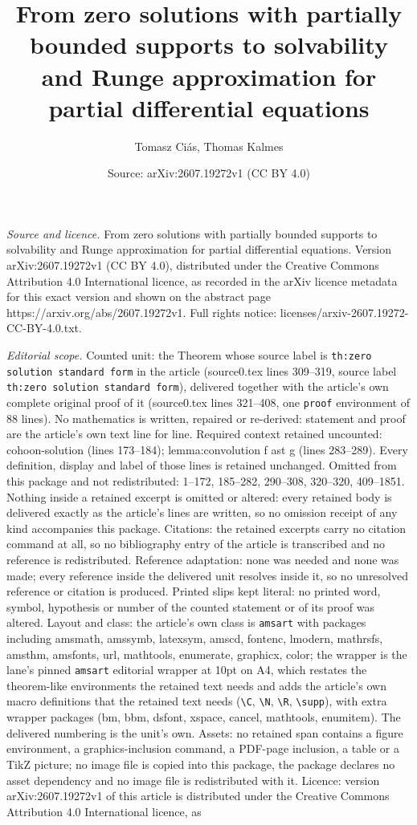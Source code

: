 \documentclass[10pt,a4paper]{amsart}
\title[From zero solutions with partially bounded supports to solva]{From zero solutions with partially bounded supports to solvability and Runge approximation for partial differential equations}
\author{Tomasz Ci\'as, Thomas Kalmes}
\date{Source: arXiv:2607.19272v1 (CC BY 4.0)}
\begin{document}
\maketitle

\noindent\emph{Source and licence.} From zero solutions with partially bounded supports to solvability and Runge approximation for partial differential equations. Version arXiv:2607.19272v1 (CC BY 4.0), distributed under the Creative Commons Attribution 4.0 International licence, as recorded in the arXiv licence metadata for this exact version and shown on the abstract page https://arxiv.org/abs/2607.19272v1. Full rights notice: licenses/arxiv-2607.19272-CC-BY-4.0.txt.\par\smallskip

\noindent\textit{Editorial scope.} Counted unit: the Theorem whose source label is \texttt{th:zero solution standard form} in the article (source0.tex lines 309--319, source label \texttt{th:zero solution standard form}), delivered together with the article's own complete original proof of it (source0.tex lines 321--408, one \texttt{proof} environment of 88 lines). No mathematics is written, repaired or re-derived: statement and proof are the article's own text line for line. Required context retained uncounted: cohoon-solution (lines 173--184); lemma:convolution f ast g (lines 283--289). Every definition, display and label of those lines is retained unchanged. Omitted from this package and not redistributed: 1--172, 185--282, 290--308, 320--320, 409--1851. Nothing inside a retained excerpt is omitted or altered: every retained body is delivered exactly as the article's lines are written, so no omission receipt of any kind accompanies this package. Citations: the retained excerpts carry no citation command at all, so no bibliography entry of the article is transcribed and no reference is redistributed. Reference adaptation: none was needed and none was made; every reference inside the delivered unit resolves inside it, so no unresolved reference or citation is produced. Printed slips kept literal: no printed word, symbol, hypothesis or number of the counted statement or of its proof was altered. Layout and class: the article's own class is \texttt{amsart} with packages including amsmath, amssymb, latexsym, amscd, fontenc, lmodern, mathrsfs, amsthm, amsfonts, url, mathtools, enumerate, graphicx, color; the wrapper is the lane's pinned \texttt{amsart} editorial wrapper at 10pt on A4, which restates the theorem-like environments the retained text needs and adds the article's own macro definitions that the retained text needs (\texttt{\textbackslash C}, \texttt{\textbackslash N}, \texttt{\textbackslash R}, \texttt{\textbackslash supp}), with extra wrapper packages (bm, bbm, dsfont, xspace, cancel, mathtools, enumitem). The delivered numbering is the unit's own. Assets: no retained span contains a figure environment, a graphics-inclusion command, a PDF-page inclusion, a table or a TikZ picture; no image file is copied into this package, the package declares no asset dependency and no image file is redistributed with it. Licence: version arXiv:2607.19272v1 of this article is distributed under the Creative Commons Attribution 4.0 International licence, as 
\end{document}
